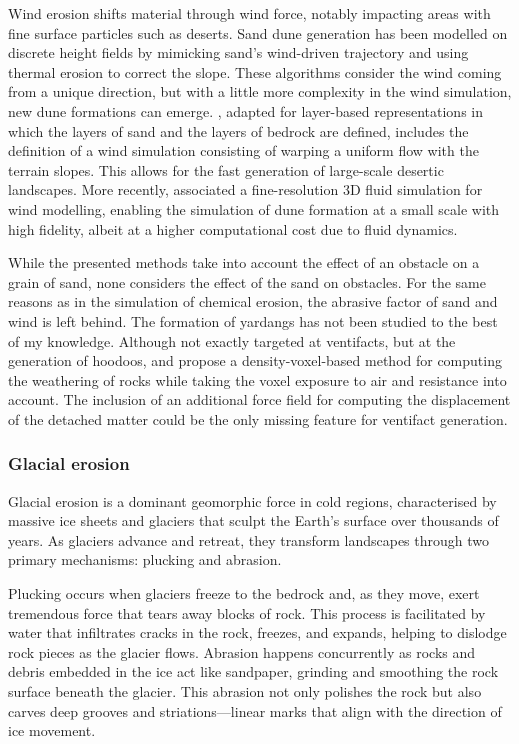 \smallConclusion

Wind erosion shifts material through wind force, notably impacting areas with fine surface particles such as deserts.  
Sand dune generation has been modelled on discrete height fields \cite{Roa2004} by mimicking sand's wind-driven trajectory and using thermal erosion to correct the slope. These algorithms consider the wind coming from a unique direction, but with a little more complexity in the wind simulation, new dune formations can emerge. \cite{Paris2019b}, adapted for layer-based representations in which the layers of sand and the layers of bedrock are defined, includes the definition of a wind simulation consisting of warping a uniform flow with the terrain slopes. This allows for the fast generation of large-scale desertic landscapes. More recently, \cite{Rosset2024} associated a fine-resolution 3D fluid simulation for wind modelling, enabling the simulation of dune formation at a small scale with high fidelity, albeit at a higher computational cost due to fluid dynamics.

While the presented methods take into account the effect of an obstacle on a grain of sand, none considers the effect of the sand on obstacles. For the same reasons as in the simulation of chemical erosion, the abrasive factor of sand and wind is left behind. The formation of yardangs has not been studied to the best of my knowledge. Although not exactly targeted at ventifacts, but at the generation of hoodoos, \cite{Beardall2007} and \cite{Jones2010} propose a density-voxel-based method for computing the weathering of rocks while taking the voxel exposure to air and resistance into account. The inclusion of an additional force field for computing the displacement of the detached matter could be the only missing feature for ventifact generation.


\subsubsection{Glacial erosion}
Glacial erosion is a dominant geomorphic force in cold regions, characterised by massive ice sheets and glaciers that sculpt the Earth's surface over thousands of years. As glaciers advance and retreat, they transform landscapes through two primary mechanisms: plucking and abrasion.

Plucking occurs when glaciers freeze to the bedrock and, as they move, exert tremendous force that tears away blocks of rock. This process is facilitated by water that infiltrates cracks in the rock, freezes, and expands, helping to dislodge rock pieces as the glacier flows. Abrasion happens concurrently as rocks and debris embedded in the ice act like sandpaper, grinding and smoothing the rock surface beneath the glacier. This abrasion not only polishes the rock but also carves deep grooves and striations—linear marks that align with the direction of ice movement.

